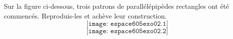 Sur la figure ci-dessous, trois patrons de parallélépipèdes rectangles ont été commencés. Reproduis-les et achève leur construction.
\[\texttt{[image: espace605exo02.1]}\]
\[\texttt{[image: espace605exo02.2]}\]